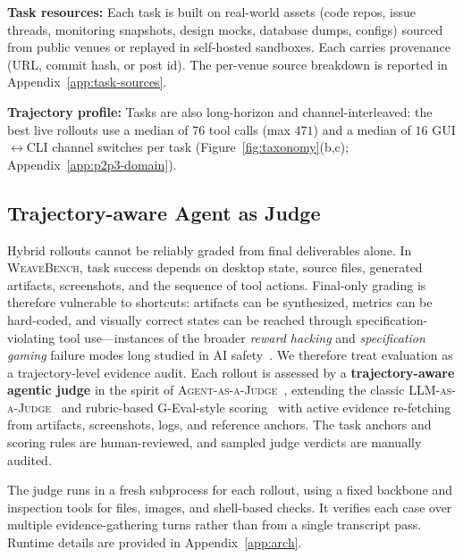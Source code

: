 \noindent\textbf{Task resources:} Each task is built on real-world assets (code repos, issue threads, monitoring snapshots, design mocks, database dumps, configs) sourced from public venues or replayed in self-hosted sandboxes. Each carries provenance (URL, commit hash, or post id).
The per-venue source breakdown is reported in Appendix~\ref{app:task-sources}.

\noindent\textbf{Trajectory profile:} Tasks are also long-horizon and channel-interleaved: the best live rollouts use a median of $76$ tool calls (max $471$) and a median of $16$ GUI$\leftrightarrow$CLI channel switches per task (Figure~\ref{fig:taxonomy}(b,c); Appendix~\ref{app:p2p3-domain}).

\subsection{Trajectory-aware Agent as Judge}
\label{sec:grader}

Hybrid rollouts cannot be reliably graded from final deliverables alone. In \textsc{WeaveBench}, task success depends on desktop state, source files, generated artifacts, screenshots, and the sequence of tool actions. Final-only grading is therefore vulnerable to shortcuts: artifacts can be synthesized, metrics can be hard-coded, and visually correct states can be reached through specification-violating tool use---instances of the broader \emph{reward hacking} and \emph{specification gaming} failure modes long studied in AI safety~\citep{amodei2016concrete,krakovna2020specgaming}. We therefore treat evaluation as a trajectory-level evidence audit. Each rollout is assessed by a \textbf{trajectory-aware agentic judge} in the spirit of \textsc{Agent-as-a-Judge}~\citep{zhuge2024agentasjudge}, extending the classic \textsc{LLM-as-a-Judge}~\citep{zheng2023llmjudge} and rubric-based G-Eval-style scoring~\citep{liu2023geval} with active evidence re-fetching from artifacts, screenshots, logs, and reference anchors. The task anchors and scoring rules are human-reviewed, and sampled judge verdicts are manually audited.

The judge runs in a fresh subprocess for each rollout, using a fixed backbone and inspection tools for files, images, and shell-based checks. It verifies each case over multiple evidence-gathering turns rather than from a single transcript pass. Runtime details are provided in Appendix~\ref{app:arch}.

